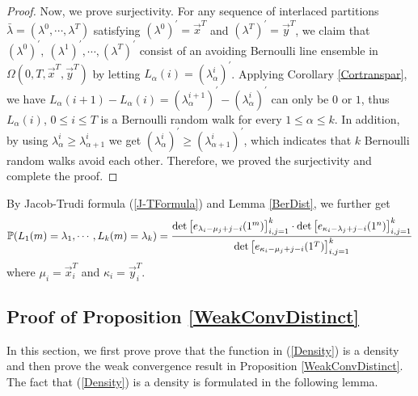 \begin{proof}
Now, we prove surjectivity. For any sequence of interlaced partitions $\bar\lambda=(\lambda^0,\cdots,\lambda^T)$ satisfying $(\lambda^{0})^{\prime}=\vec{x}^{T}$ and $(\lambda^{T})^{\prime}=\vec{y}^{T}$, we claim that $(\lambda^{0})^{\prime},\ (\lambda^{1})^{\prime},\cdots, (\lambda^{T})^{\prime}$ consist of an avoiding Bernoulli line ensemble in $\Omega(0,T,\vec{x}^{T},\vec{y}^{T})$ by letting $L_{\alpha}(i)=(\lambda_{\alpha}^{i})^{\prime}$. Applying Corollary \ref{Cortranspar}, we have $L_{\alpha}(i+1)-L_{\alpha}(i)=(\lambda_{\alpha}^{i+1})^{\prime}-(\lambda_{\alpha}^{i})^{\prime}$ can only be $0$ or $1$, thus $L_{\alpha}(i)$, $0\leq i\leq T$ is a Bernoulli random walk for every $1\leq \alpha\leq k$. In addition, by using $\lambda_{\alpha}^{i}\geq \lambda_{\alpha+1}^{i}$ we get $(\lambda_{\alpha}^{i})^{\prime}\geq (\lambda_{\alpha+1}^{i})^{\prime}$, which indicates that $k$ Bernoulli random walks avoid each other. Therefore, we proved the surjectivity and complete the proof.
\end{proof}

By Jacob-Trudi formula (\ref	{J-TFormula}) and Lemma \ref	{BerDist}, we further get
\begin{align}{\label{BerDistJT}}
	\begin{split}
		\mathbb{P}(L_1(m)=\lambda_1,\cdots, L_k(m)=\lambda_k)=\frac{\det\left[e_{\lambda_{i}-\mu_{j}+j-i}(1^{m})\right]_{i,j=1}^{k}\cdot\det\left[e_{\kappa_{i}-\lambda_{j}+j-i}(1^{n})\right]_{i,j=1}^{k}}{\det\left[e_{\kappa_{i}-\mu_{j}+j-i}(1^{T})\right]_{i,j=1}^{k}}
	\end{split}
\end{align}
where $\mu_{i}=\vec{x}^{T}_{i}$ and $\kappa_{i}=\vec{y}^{T}_{i}$.
\subsection{Proof of Proposition \ref{WeakConvDistinct}}{\label{ProofProp1}} In this section, we first prove prove that the function in (\ref{Density}) is a density and then prove the weak convergence result in Proposition \ref{WeakConvDistinct}. The fact that (\ref{Density}) is a density is formulated in the following lemma.


